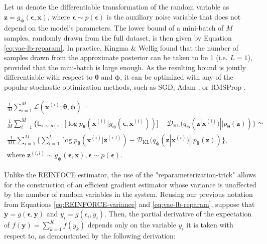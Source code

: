 \documentclass{report}
\begin{document}
\noindent Let us denote the differentiable transformation of the random variable as $\boldsymbol{z} = g_{\boldsymbol{\phi}}(\boldsymbol{\epsilon}, \boldsymbol{x})$, where $\boldsymbol{\epsilon} \sim p(\boldsymbol{\epsilon})$ is the auxiliary noise variable that does not depend on the model's parameters. The lower bound of a mini-batch of $M$ samples, randomly drawn from the full dataset, is then given by Equation \ref{eq:vae-lb-reparam}. In practice, Kingma \& Wellig \cite{vae} found that the number of samples drawn from the approximate posterior can be taken to be 1 (i.e. $L=1$), provided that the mini-batch is large enough. As the resulting bound is jointly differentiable with respect to $\boldsymbol{\theta}$ and $\boldsymbol{\phi}$, it can be optimized with any of the popular stochastic optimization methods, such as SGD, Adam \cite{adam}, or RMSProp \cite{rmsprop}.

\begin{equation}
\begin{gathered}
\frac{1}{M} \sum_{i=1}^M \mathcal{L}(\boldsymbol{x}^{(i)}; \boldsymbol{\theta}, \boldsymbol{\phi}) = \\
\frac{1}{M} \sum_{i=1}^M \Big\{ \mathbb{E}_{{\boldsymbol{\epsilon}} \sim p({\boldsymbol{\epsilon}})} \big[ \log p_{\boldsymbol{\theta}} (\boldsymbol{x}^{(i)} | g_{\boldsymbol{\phi}}(\boldsymbol{\epsilon}, \boldsymbol{x}^{(i)})) \big] - \mathcal{D}_{\text{KL}}(q_{\boldsymbol{\phi}}(\boldsymbol{z}|\boldsymbol{x}^{(i)}) || p_{\boldsymbol{\theta}}(\boldsymbol{z})) \Big\} \simeq \\
\frac{1}{ML} \sum_{i=1}^M \Big\{ \sum_{l=1}^L \log p_{\boldsymbol{\theta}} (\boldsymbol{x}^{(i)} | \boldsymbol{z}^{(i, l)}) - \mathcal{D}_{\text{KL}}(q_{\boldsymbol{\phi}}(\boldsymbol{z}|\boldsymbol{x}^{(i)}) || p_{\boldsymbol{\theta}}(\boldsymbol{z})) \Big\}, \\
\text{where } \boldsymbol{z}^{(i, l)} \sim g_{\boldsymbol{\phi}}(\boldsymbol{\epsilon}, \boldsymbol{x}), \boldsymbol{\epsilon} \sim p(\boldsymbol{\epsilon}).
\end{gathered}
\label{eq:vae-lb-reparam}
\end{equation}

\bigskip

\noindent Unlike the REINFOCE estimator, the use of the "reparameterization-trick" allows for the construction of an efficient gradient estimator whose variance is unaffected by the number of random variables in the system. Reusing our previous notation from Equations \ref{eq:REINFORCE-variance} and \ref{eq:vae-lb-reparam}, suppose that $\boldsymbol{y} = g(\boldsymbol{\epsilon}, \boldsymbol{y})$ and $y_i = g(\epsilon_i, y_i)$. Then, the partial derivative of the expectation of $f(\boldsymbol{y}) = \sum_{k=1}^K f(y_k)$ depends only on the variable $y_i$ it is taken with respect to, as demonstrated by the following derivation:
\end{document}
